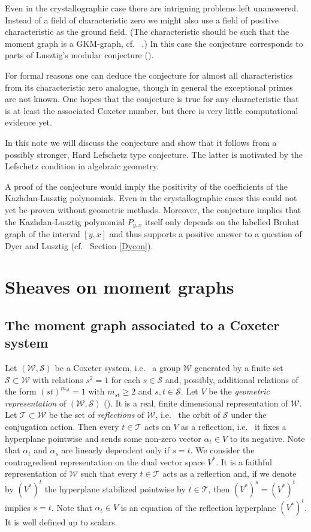 \documentclass[12pt]{amsart}
\theoremstyle{definition}
\theoremstyle{remark}
\newcommand{\CS}{{\mathcal S}}
\newcommand{\CT}{{\mathcal T}}
\newcommand{\CW}{{\mathcal W}}
\begin{document}
Even in the crystallographic case there are intriguing problems left unanswered. Instead of a field of characteristic zero we might also use a field of positive characteristic as the ground field. (The characteristic should be such that the moment graph is a GKM-graph, cf.~ \cite{Fie1}.) In this case the conjecture corresponds to parts  of Lusztig's modular conjecture (\cite{Soe2}). 

For formal reasons one can deduce the conjecture for almost all characteristics from its characteristic zero analogue, though in general the exceptional primes are not known. One hopes that the conjecture is true for any characteristic that is at least the associated Coxeter number, but there is very little computational evidence yet.

In this note we will discuss the conjecture and show that it follows from a possibly stronger, Hard Lefschetz type conjecture. The latter is motivated by the Lefschetz condition in algebraic geometry. 
 
A proof of the conjecture would imply the positivity of the coefficients of the Kazhdan-Lusztig polynomials. Even in the crystallographic cases this could not yet be proven without geometric methods. Moreover, the conjecture implies that the Kazhdan-Lusztig polynomial $P_{y,x}$ itself only depends on the labelled Bruhat graph of the interval $[y,x]$ and thus supports a positive answer to a question of Dyer and Lusztig (cf.~ Section \ref{Dycon}). 



\section{Sheaves on moment graphs}

\subsection{The moment graph associated to a Coxeter system}

Let $(\CW,\CS)$ be a Coxeter system, i.e.~ a group $\CW$ generated by a finite set $\CS\subset\CW$ with relations $s^2=1$ for each $s\in\CS$ and, possibly, additional relations of the form  $(st)^{m_{st}}=1$ with $m_{st}\geq 2$ and $s,t\in\CS$. Let $V$ be the {\em geometric representation}  of $(\CW,\CS)$ (\cite[5.3]{Hum}). It is a real, finite dimensional representation of $\CW$. Let $\CT\subset\CW$ be the set of {\em reflections} of $\CW$, i.e.~ the orbit of $\CS$ under the conjugation action. Then every $t\in\CT$ acts on $V$ as a reflection, i.e.~ it fixes a hyperplane pointwise and sends some non-zero vector $\alpha_t\in V$ to its negative. Note that $\alpha_t$ and $\alpha_s$ are linearly dependent only if $s=t$. We consider the contragredient representation on the dual vector space $V^\ast$. It is a faithful representation of $\CW$ such that every $t\in\CT$ acts as a reflection and, if we denote by $(V^\ast)^t$ the hyperplane stabilized pointwise by $t\in\CT$, then $(V^\ast)^s=(V^\ast)^t$ implies $s=t$. Note that $\alpha_t\in V$ is an equation of the reflection hyperplane $(V^\ast)^t$. It is well defined up to scalars. 
\end{document}
